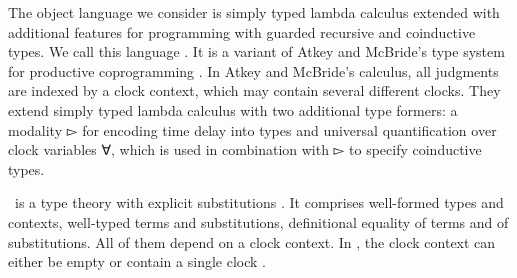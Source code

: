 
The object language we consider is simply typed lambda calculus
extended with additional features for programming with guarded recursive and coinductive
types. We call this language \GTT. It is a variant of Atkey and McBride's type system %
for
productive coprogramming \cite{atkey2013productive}. In Atkey and McBride's calculus, all judgments are indexed by a clock context,
which may contain several different clocks. They extend simply typed
lambda calculus with two additional type formers: a modality ▻ for
encoding time delay into types and universal quantification over clock
variables ∀, which is used in combination with ▻ to specify coinductive types.

\GTT\ is a type theory with explicit substitutions \cite{AbadiCCL91}. It comprises
well-formed types and contexts, well-typed terms and substitutions,
definitional equality of terms and of substitutions. All of them depend on a clock context.
In \GTT, the clock context can either be empty or contain a single clock .

